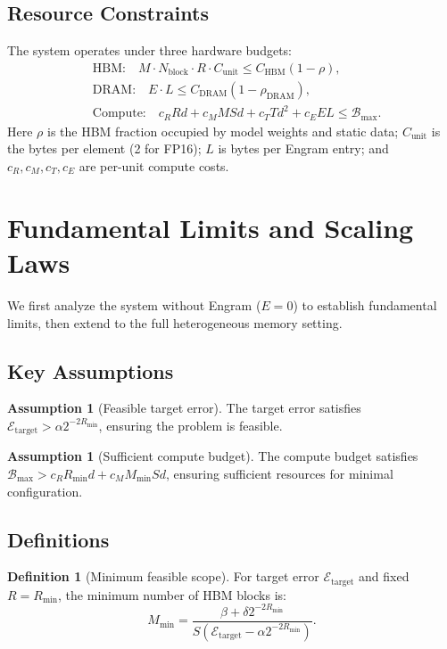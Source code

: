 \documentclass[11pt,a4paper]{article}
\theoremstyle{plain}
\theoremstyle{definition}
\newtheorem{definition}[theorem]{Definition}
\newtheorem{assumption}[theorem]{Assumption}
\begin{document}
\subsection{Resource Constraints}
The system operates under three hardware budgets:
\begin{align}
&\text{HBM:}\quad M \cdot N_{\text{block}} \cdot R \cdot C_{\text{unit}} \leq C_{\text{HBM}}(1-\rho), \label{eq:hbm}\\
&\text{DRAM:}\quad E \cdot L \leq C_{\text{DRAM}}(1-\rho_{\text{DRAM}}), \label{eq:dram}\\
&\text{Compute:}\quad c_R R d + c_M M S d + c_T T d^2 + c_E E L \leq \mathcal{B}_{\max}. \label{eq:compute}
\end{align}
Here $\rho$ is the HBM fraction occupied by model weights and static data; $C_{\text{unit}}$ is the bytes per element (2 for FP16); $L$ is bytes per Engram entry; and $c_R, c_M, c_T, c_E$ are per-unit compute costs.

\section{Fundamental Limits and Scaling Laws}
\label{sec:theory}

We first analyze the system without Engram ($E=0$) to establish fundamental limits, then extend to the full heterogeneous memory setting.

\subsection{Key Assumptions}
\begin{assumption}[Feasible target error]\label{ass:feasible}
The target error satisfies $\mathcal{E}_{\text{target}} > \alpha 2^{-2R_{\min}}$, ensuring the problem is feasible.
\end{assumption}

\begin{assumption}[Sufficient compute budget]\label{ass:compute}
The compute budget satisfies $\mathcal{B}_{\max} > c_R R_{\min} d + c_M M_{\min} S d$, ensuring sufficient resources for minimal configuration.
\end{assumption}

\subsection{Definitions}
\begin{definition}[Minimum feasible scope]
For target error $\mathcal{E}_{\text{target}}$ and fixed $R=R_{\min}$, the minimum number of HBM blocks is:
\begin{equation}
M_{\min} = \frac{\beta + \delta 2^{-2R_{\min}}}{S(\mathcal{E}_{\text{target}} - \alpha 2^{-2R_{\min}})}. \label{eq:Mmin}
\end{equation}
\end{definition}
\end{document}
